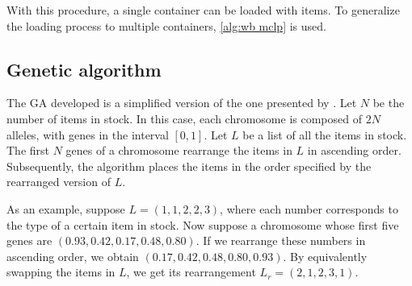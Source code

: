 With this procedure, a single container can be loaded with items. To generalize the loading process to multiple containers, \cref{alg:wb mclp} is used.



\subsection{Genetic algorithm}

The GA developed is a simplified version of the one presented by \textcite{GONÇALVES2011}. Let $N$ be the number of items in stock. In this case, each chromosome is composed of $2N$ alleles, with genes in the interval $[0, 1]$. Let $L$ be a list of all the items in stock. The first $N$ genes of a chromosome rearrange the items in $L$ in ascending order. Subsequently, the algorithm places the items in the order specified by the rearranged version of $L$.

As an example, suppose $L = (1, 1, 2, 2, 3)$, where each number corresponds to the type of a certain item in stock. Now suppose a chromosome whose first five genes are $(0.93, 0.42, 0.17, 0.48, 0.80)$. If we rearrange these numbers in ascending order, we obtain $(0.17, 0.42, 0.48, 0.80, 0.93)$. By equivalently swapping the items in $L$, we get its rearrangement $L_r = (2, 1, 2, 3, 1)$.